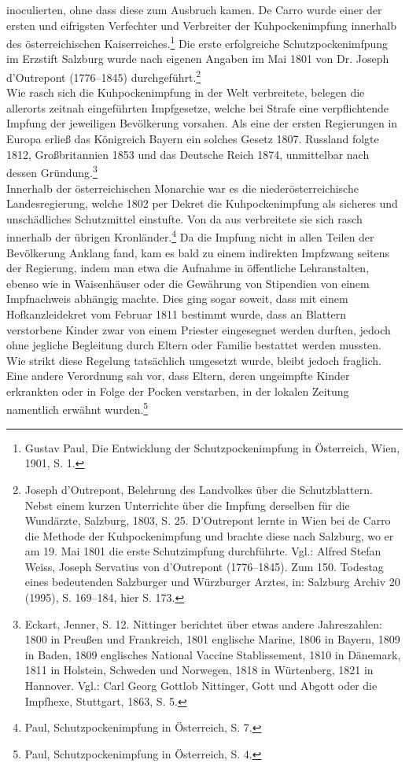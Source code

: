 \documentclass[
    a4paper,
    12pt,
    hyphens,
    chapterprefix=true,
    headheight=33pt,
    footheight=29pt,
    headings=optiontohead, %
]{scrartcl}
\begin{document}
inoculierten, ohne dass diese zum Ausbruch kamen. De Carro wurde einer der ersten und eifrigsten Verfechter und Verbreiter der Kuhpockenimpfung innerhalb des österreichischen Kaiserreiches.\footnote{Gustav Paul, Die Entwicklung der Schutzpockenimpfung in Österreich, Wien, 1901, S. 1.} Die erste erfolgreiche Schutzpockenimfpung im Erzstift Salzburg wurde nach eigenen Angaben im Mai 1801 von Dr. Joseph d'Outrepont (1776--1845) durchgeführt.\footnote{Joseph d'Outrepont, Belehrung des Landvolkes über die Schutzblattern. Nebst einem kurzen Unterrichte über die Impfung derselben für die Wundärzte, Salzburg, 1803, S. 25. D'Outrepont lernte in Wien bei de Carro die Methode der Kuhpockenimpfung und brachte diese nach Salzburg, wo er am 19. Mai 1801 die erste Schutzimpfung durchführte. Vgl.: Alfred Stefan Weiss, Joseph Servatius von d'Outrepont (1776--1845). Zum 150. Todestag eines bedeutenden Salzburger und Würzburger Arztes, in: Salzburg Archiv 20 (1995), S. 169--184, hier S. 173.}\\
Wie rasch sich die Kuhpockenimpfung in der Welt verbreitete, belegen die allerorts zeitnah eingeführten Impfgesetze, welche bei Strafe eine verpflichtende Impfung der jeweiligen Bevölkerung vorsahen. Als eine der ersten Regierungen in Europa erließ das Königreich Bayern ein solches Gesetz 1807. Russland folgte 1812, Großbritannien 1853 und das Deutsche Reich 1874, unmittelbar nach dessen Gründung.\footnote{Eckart, Jenner, S. 12. Nittinger berichtet über etwas andere Jahreszahlen: 1800 in Preußen und Frankreich, 1801 englische Marine, 1806 in Bayern, 1809 in Baden, 1809 englisches National Vaccine Stablissement, 1810 in Dänemark, 1811 in Holstein, Schweden und Norwegen, 1818 in Würtenberg, 1821 in Hannover. Vgl.: Carl Georg Gottlob Nittinger, Gott und Abgott oder die Impfhexe, Stuttgart, 1863, S. 5.}\\
Innerhalb der österreichischen Monarchie war es die niederösterreichische Landesregierung, welche 1802 per Dekret die Kuhpockenimpfung als sicheres und unschädliches Schutzmittel einstufte. Von da aus verbreitete sie sich rasch innerhalb der übrigen Kronländer.\footnote{Paul, Schutzpockenimpfung in Österreich, S. 7.} Da die Impfung nicht in allen Teilen der Bevölkerung Anklang fand, kam es bald zu einem indirekten Impfzwang seitens der Regierung, indem man etwa die Aufnahme in öffentliche Lehranstalten, ebenso wie in Waisenhäuser oder die Gewährung von Stipendien von einem Impfnachweis abhängig machte. Dies ging sogar soweit, dass mit einem Hofkanzleidekret vom Februar 1811 bestimmt wurde, dass an Blattern verstorbene Kinder zwar von einem Priester eingesegnet werden durften, jedoch ohne jegliche Begleitung durch Eltern oder Familie bestattet werden mussten. Wie strikt diese Regelung tatsächlich umgesetzt wurde, bleibt jedoch fraglich. Eine andere Verordnung sah vor, dass Eltern, deren ungeimpfte Kinder erkrankten oder in Folge der Pocken verstarben, in der lokalen Zeitung namentlich erwähnt wurden.\footnote{Paul, Schutzpockenimpfung in Österreich, S. 4.}\\
\end{document}
